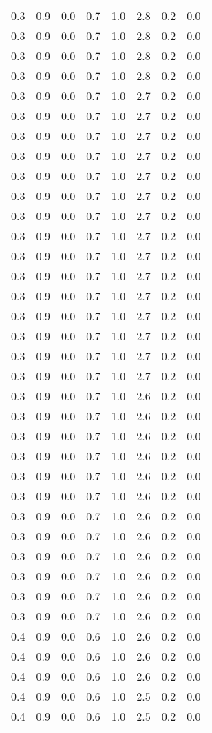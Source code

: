 \begin{tabular}{L{1in}|L{1in}|L{1in}|L{1in}|L{1in}|L{1in}|L{1in}|L{1in}}
0.3&0.9&0.0&0.7&1.0&2.8&0.2&0.0\\
0.3&0.9&0.0&0.7&1.0&2.8&0.2&0.0\\
0.3&0.9&0.0&0.7&1.0&2.8&0.2&0.0\\
0.3&0.9&0.0&0.7&1.0&2.8&0.2&0.0\\
0.3&0.9&0.0&0.7&1.0&2.7&0.2&0.0\\
0.3&0.9&0.0&0.7&1.0&2.7&0.2&0.0\\
0.3&0.9&0.0&0.7&1.0&2.7&0.2&0.0\\
0.3&0.9&0.0&0.7&1.0&2.7&0.2&0.0\\
0.3&0.9&0.0&0.7&1.0&2.7&0.2&0.0\\
0.3&0.9&0.0&0.7&1.0&2.7&0.2&0.0\\
0.3&0.9&0.0&0.7&1.0&2.7&0.2&0.0\\
0.3&0.9&0.0&0.7&1.0&2.7&0.2&0.0\\
0.3&0.9&0.0&0.7&1.0&2.7&0.2&0.0\\
0.3&0.9&0.0&0.7&1.0&2.7&0.2&0.0\\
0.3&0.9&0.0&0.7&1.0&2.7&0.2&0.0\\
0.3&0.9&0.0&0.7&1.0&2.7&0.2&0.0\\
0.3&0.9&0.0&0.7&1.0&2.7&0.2&0.0\\
0.3&0.9&0.0&0.7&1.0&2.7&0.2&0.0\\
0.3&0.9&0.0&0.7&1.0&2.7&0.2&0.0\\
0.3&0.9&0.0&0.7&1.0&2.6&0.2&0.0\\
0.3&0.9&0.0&0.7&1.0&2.6&0.2&0.0\\
0.3&0.9&0.0&0.7&1.0&2.6&0.2&0.0\\
0.3&0.9&0.0&0.7&1.0&2.6&0.2&0.0\\
0.3&0.9&0.0&0.7&1.0&2.6&0.2&0.0\\
0.3&0.9&0.0&0.7&1.0&2.6&0.2&0.0\\
0.3&0.9&0.0&0.7&1.0&2.6&0.2&0.0\\
0.3&0.9&0.0&0.7&1.0&2.6&0.2&0.0\\
0.3&0.9&0.0&0.7&1.0&2.6&0.2&0.0\\
0.3&0.9&0.0&0.7&1.0&2.6&0.2&0.0\\
0.3&0.9&0.0&0.7&1.0&2.6&0.2&0.0\\
0.3&0.9&0.0&0.7&1.0&2.6&0.2&0.0\\
0.4&0.9&0.0&0.6&1.0&2.6&0.2&0.0\\
0.4&0.9&0.0&0.6&1.0&2.6&0.2&0.0\\
0.4&0.9&0.0&0.6&1.0&2.6&0.2&0.0\\
0.4&0.9&0.0&0.6&1.0&2.5&0.2&0.0\\
0.4&0.9&0.0&0.6&1.0&2.5&0.2&0.0\\

\end{tabular}
